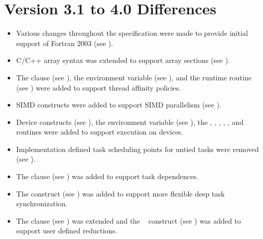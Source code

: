 \section{Version 3.1 to 4.0 Differences}
\label{sec:Version 3.1 to 4.0 Differences}
\begin{itemize}
\item Various changes throughout the specification were made to provide initial support of 
Fortran 2003 (see 
). 

\item C/C++ array syntax was extended to support array sections (see
). 

\item The  clause (see 
), 
the  
environment variable (see 
), and the  
runtime routine (see 
) 
were added to support thread 
affinity policies. 

\item SIMD constructs were added to support SIMD parallelism (see 
). 

\item Device constructs (see 
), 
the  
environment variable (see 
), the 
, , 
, , , and 
 routines were added to support execution on devices. 

\item Implementation defined task scheduling points for untied tasks were removed (see 
). 

\item The  clause (see 
) 
was added to support task dependences. 

\item The  construct (see 
) was added to support 
more flexible deep task synchronization. 

\item The  clause (see 
) was extended and the 
~ construct (see 
) was added to 
support user defined reductions.


\end{itemize}
